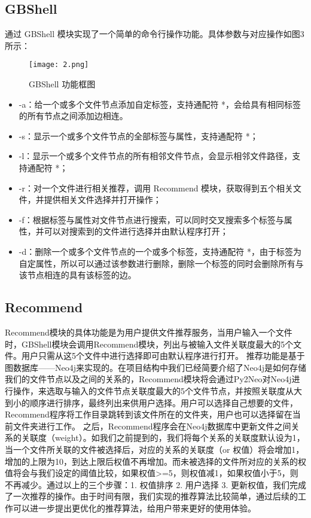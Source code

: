 \documentclass[UTF8]{ctexart}
\begin{document}
\subsection{GBShell}
通过 GBShell 模块实现了一个简单的命令行操作功能。具体参数与对应操作如图3所示：

\begin{figure}
\centering\texttt{[image: 2.png]}
\caption{GBShell 功能框图}
\end{figure}

\begin{itemize}
  \item -a：给一个或多个文件节点添加自定标签，支持通配符 *，会给具有相同标签的所有节点之间添加边相连。
  \item -s：显示一个或多个文件节点的全部标签与属性，支持通配符 *；
  \item -l：显示一个或多个文件节点的所有相邻文件节点，会显示相邻文件路径，支持通配符 *；
  \item -r：对一个文件进行相关推荐，调用 Recommend 模块，获取得到五个相关文件，并提供相关文件选择并打开操作；
  \item -f：根据标签与属性对文件节点进行搜索，可以同时交叉搜索多个标签与属性，并可以对搜索到的文件进行选择并由默认程序打开；
 \item -d：删除一个或多个文件节点的一个或多个标签，支持通配符 *，由于标签为自定属性，所以可以通过该参数进行删除，删除一个标签的同时会删除所有与该节点相连的具有该标签的边。
\end{itemize}

\subsection{Recommend}
Recommend模块的具体功能是为用户提供文件推荐服务，当用户输入一个文件时，GBShell模块会调用Recommend模块，列出与被输入文件关联度最大的5个文件。用户只需从这5个文件中进行选择即可由默认程序进行打开。
推荐功能是基于图数据库——Neo4j来实现的。在项目结构中我们已经简要介绍了Neo4j是如何存储我们的文件节点以及之间的关系的，Recommend模块将会通过Py2Neo对Neo4j进行操作，来选取与输入的文件节点关联度最大的5个文件节点，并按照关联度从大到小的顺序进行排序，最终列出来供用户选择。用户可以选择自己想要的文件，Recommend程序将工作目录跳转到该文件所在的文件夹，用户也可以选择留在当前文件夹进行工作。
之后，Recommend程序会在Neo4j数据库中更新文件之间关系的关联度（weight）。如我们之前提到的，我们将每个关系的关联度默认设为1，当一个文件所关联的文件被选择后，对应的关系的关联度（or 权值）将会增加1，增加的上限为10，到达上限后权值不再增加。而未被选择的文件所对应的关系的权值将会与我们设定的阈值比较，如果权值>=5，则权值减1，如果权值小于5，则不再减少。通过以上的三个步骤：1. 权值排序 2. 用户选择 3. 更新权值，我们完成了一次推荐的操作。由于时间有限，我们实现的推荐算法比较简单，通过后续的工作可以进一步提出更优化的推荐算法，给用户带来更好的使用体验。
\end{document}
